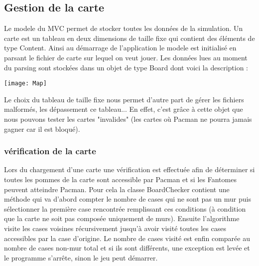 \subsection{Gestion de la carte}

Le modele du MVC permet de stocker toutes les données de la simulation. Un carte est un tableau en deux dimensions de taille fixe qui contient des éléments de type Content. Ainsi au démarrage de l'application le modele est initialisé en parsant le fichier de carte sur lequel on veut jouer. Les données lues au moment du parsing sont stockées dans un objet de type Board dont voici la description : \\[0.5cm]
\centerline{\texttt{[image: Map]}}

Le choix du tableau de taille fixe nous permet d'autre part de gérer les fichiers malformés, les dépassement ce tableau... En effet, c'est grâce à cette objet que nous pouvons tester les cartes "invalides" (les cartes où Pacman ne pourra jamais gagner car il est bloqué).

\subsubsection{vérification de la carte}

Lors du chargement d'une carte une vérification est effectuée afin de déterminer si toutes les pommes de la carte sont accessible par Pacman et si les Fantomes peuvent atteindre Pacman. Pour cela la classe BoardChecker contient une méthode qui va d'abord compter le nombre de cases qui ne sont pas un mur puis sélectionner la première case rencontrée remplissant ces conditions (à condition que la carte ne soit pas composée uniquement de murs). Ensuite l'algorithme visite les cases voisines récursivement jusqu'à avoir visité toutes les cases accessibles par la case d'origine. Le nombre de cases visité est enfin comparée au nombre de cases non-mur total et si ils sont différents, une exception est levée et le programme s'arrête, sinon le jeu peut démarrer.
